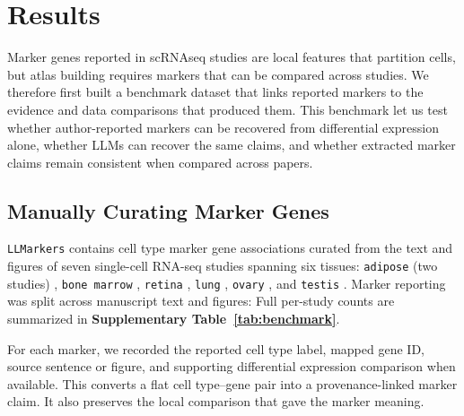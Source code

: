 \documentclass[10pt,twocolumn]{article}
\theoremstyle{plain}
\theoremstyle{definition}
\theoremstyle{remark}
\begin{document}
\section{Results}
Marker genes reported in scRNAseq studies are local features that partition cells, but atlas building requires markers that can be compared across studies. We therefore first built a benchmark dataset that links reported markers to the evidence and data comparisons that produced them. This benchmark let us test whether author-reported markers can be recovered from differential expression alone, whether LLMs can recover the same claims, and whether extracted marker claims remain consistent when compared across papers.


\subsection*{Manually Curating Marker Genes}
\texttt{LLMarkers} contains cell type marker gene associations curated from the text and figures of seven single-cell RNA-seq studies spanning six tissues: \texttt{adipose} (two studies) \citep{Emont2022,Hildreth2021}, \texttt{bone marrow} \citep{Zhong2020bone}, \texttt{retina} \citep{Gautam2021}, \texttt{lung} \citep{Adams2020}, \texttt{ovary} \citep{Wagner2020}, and \texttt{testis} \citep{Shamis2020}.  Marker reporting was split across manuscript text and figures:  Full per-study counts are summarized in \textbf{Supplementary Table~\ref{tab:benchmark}}.

For each marker, we recorded the reported cell type label, mapped gene ID, source sentence or figure, and supporting differential expression comparison when available. This converts a flat cell type--gene pair into a provenance-linked marker claim. It also preserves the local comparison that gave the marker meaning.
\end{document}
